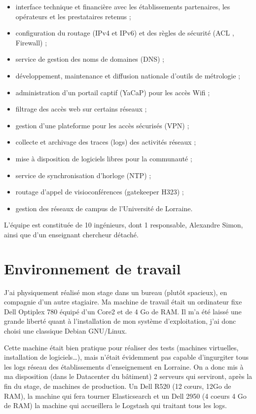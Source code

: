 \documentclass[a4paper,12pt,one side,titlepage]{report}
\begin{document}
\begin{itemize}
    \item interface technique et financière avec les établissements partenaires, 
    les opérateurs et les prestataires retenus ;
    \item configuration du routage (IPv4 et IPv6) et des règles de sécurité (ACL , 
    Firewall) ;
    \item service de gestion des noms de domaines (DNS) ;
    \item développement, maintenance et diffusion nationale d’outils de métrologie  ;
    \item administration d’un portail captif (YaCaP) pour les accès Wifi ;
    \item filtrage des accès web sur certains réseaux ;
    \item gestion d’une plateforme pour les accès sécurisés (VPN) ;
    \item collecte et archivage des traces (logs) des activités réseaux ;
    \item mise à disposition de logiciels libres pour la communauté ;
    \item service de synchronisation d’horloge (NTP) ;
    \item routage d’appel de visioconférences (gatekeeper H323) ;
    \item gestion des réseaux de campus de l’Université de Lorraine.
\end{itemize}                                                

L'équipe est constituée de 10 ingénieurs, dont 1 responsable, Alexandre Simon, ainsi
que d'un enseignant chercheur détaché.


\section{Environnement de travail}
J'ai physiquement réalisé mon stage dans un bureau (plutôt spacieux), en compagnie
d'un autre stagiaire.
Ma machine de travail était un ordinateur fixe Dell Optiplex 780 équipé d'un Core2 et 
de 4 Go de RAM. Il m'a été laissé une grande liberté quant à l'installation de mon
système d'exploitation, j'ai donc choisi une classique Debian GNU/Linux.

Cette machine était bien pratique pour réaliser des tests (machines virtuelles, 
installation de logiciels\ldots), mais n'était évidemment pas capable d'ingurgiter 
tous les logs réseau des établissements d'enseignement en Lorraine. On a donc mis 
à ma disposition (dans le Datacenter du bâtiment) 2 serveurs qui serviront, après 
la fin du stage, de machines de production. Un Dell R520 (12 cœurs, 12Go de RAM),
la machine qui fera tourner Elasticsearch et un Dell 2950 (4 coeurs 4 Go de RAM)
la machine qui accueillera le Logstash qui traitant tous les logs.
\end{document}

